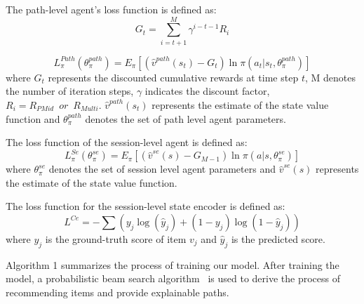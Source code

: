 \documentclass[10pt,journal,compsoc]{IEEEtran}
\begin{document}
The path-level agent's loss function is defined as:
\begin{equation}
    G_t=\sum_{i=t+1}^{M}\gamma^{i-t-1}R_i 
\end{equation}

\begin{equation}
    L_\pi^{Path}(\theta_\pi^{path})=E_\pi[(\hat{v}^{path}(s_t)-G_t)\ln\pi(a_t|s_t,\theta_\pi^{path})]
\end{equation}
where $G_t$ represents the discounted cumulative rewards at time step $t$, M denotes the number of iteration steps, $\gamma$ indicates the discount factor, $R_{i}= R_{PMid}\enspace or \enspace R_{Multi}$. $\hat{v}^{path}(s_t)$ represents the estimate of the state value function and $\theta_\pi^{path}$ denotes the set of path level agent parameters.

The loss function of the session-level agent is defined as:
\begin{equation}
    L_\pi^{Se}(\theta_\pi^{se})=E_\pi[(\hat{v}^{se}(s)-G_{M-1})\ln\pi(a|s,\theta_\pi^{se})]
\end{equation}
where $\theta_\pi^{se}$ denotes the set of session level agent parameters and $\hat{v}^{se}(s)$ represents the estimate of the state value function.

The loss function for the session-level state encoder is defined as:
\begin{equation}
    L^{Ce}=-\sum(y_j\log(\hat{y}_j)+(1-y_j)\log(1-\hat{y}_j))
\end{equation}
where $y_j$ is the ground-truth score of item $v_j$ and $\hat{y}_j$ is the predicted score.

Algorithm 1 summarizes the process of training our model. After training the model, a probabilistic beam search algorithm~\cite{rl_adac} is used to derive the process of recommending items and provide explainable paths.
\end{document}
